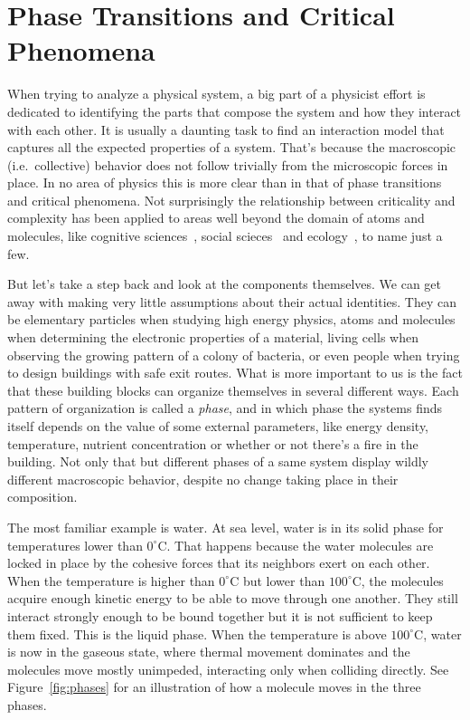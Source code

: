 \chapter{Phase Transitions and Critical Phenomena}
\label{ch:crit}

When trying to analyze a physical system, a big part of a physicist effort is
dedicated to identifying the parts that compose the system and how they
interact with each other. It is usually a daunting task to find an interaction
model that captures all the expected properties of a system. That's because the
macroscopic (i.e.\ collective) behavior does not follow trivially from the
microscopic forces in place. In no area of physics this is more clear than in
that of phase transitions and critical phenomena. Not surprisingly the
relationship between criticality and complexity has been applied to areas well
beyond the domain of atoms and molecules, like cognitive
sciences~\cite{Kello2010}, social scieces~\cite{Kron2009} and
ecology~\cite{Sole1999}, to name just a few.

But let's take a step back and look at the components themselves. We can get
away with making very little assumptions about their actual identities. They
can be elementary particles when studying high energy physics, atoms and
molecules when determining the electronic properties of a material, living
cells when observing the growing pattern of a colony of bacteria, or even
people when trying to design buildings with safe exit routes. What is more
important to us is the fact that these building blocks can organize themselves
in several different ways. Each pattern of organization is called a
\textit{phase}, and in which phase the systems finds itself depends on the
value of some external parameters, like energy density, temperature, nutrient
concentration or whether or not there's a fire in the building. Not only that
but different phases of a same system display wildly different macroscopic
behavior, despite no change taking place in their composition.

The most familiar example is water. At sea level, water is in its solid phase
for temperatures lower than $0^\circ$C. That happens because the water
molecules are locked in place by the cohesive forces that its neighbors exert
on each other. When the temperature is higher than $0^\circ$C but lower than
$100^\circ$C, the molecules acquire enough kinetic energy to be able to move
through one another. They still interact strongly enough to be bound together
but it is not sufficient to keep them fixed. This is the liquid phase. When the
temperature is above $100^\circ$C, water is now in the gaseous state, where
thermal movement dominates and the molecules move mostly unimpeded, interacting
only when colliding directly. See Figure~\ref{fig:phases} for an illustration of
how a molecule moves in the three phases.

